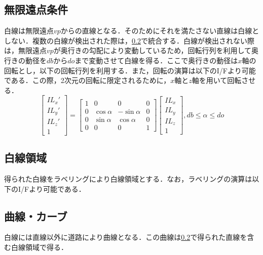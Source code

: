 \documentclass{jsarticle}
\begin{document}
\subsection{無限遠点条件}
\label{無限遠点条件}

白線は無限遠点$vp$からの直線となる．そのためにそれを満たさない直線は白線としない．複数の白線が検出された際は，\ref{白線領域}で統合する．白線が検出されない際は，無限遠点$vp$が奥行きの勾配により変動しているため，回転行列を利用して奥行きの動径を$db$から$do$まで変動させて白線を得る．ここで奥行きの動径は$x$軸の回転とし，以下の回転行列を利用する．また，回転の演算は以下のI/Fより可能である．この際，2次元の回転に限定されるために，$x$軸と$z$軸を用いて回転させる．
\[
\begin{bmatrix} IL_x' \\ IL_y' \\ IL_z' \\ 1 \end{bmatrix} =
\begin{bmatrix}
1 & 0 & 0 & 0 \\
0 & \cos \alpha & -\sin \alpha & 0 \\
0 & \sin \alpha & \cos \alpha & 0 \\
0 & 0 & 0 & 1
\end{bmatrix}
\begin{bmatrix}
IL_x \\ IL_y \\ IL_z \\ 1
\end{bmatrix},
db \leq \alpha \leq do
\]
\begin{center}
\end{center}

\subsection{白線領域}
\label{白線領域}

得られた白線をラベリングにより白線領域とする．なお，ラベリングの演算は以下のI/Fより可能である．
\begin{center}
\end{center}

\subsection{曲線・カーブ}
\label{曲線・カーブ}

白線には直線以外に道路により曲線となる．この曲線は\ref{白線領域}で得られた直線を含む白線領域で得る．
\begin{center}
\end{center}
\end{document}
